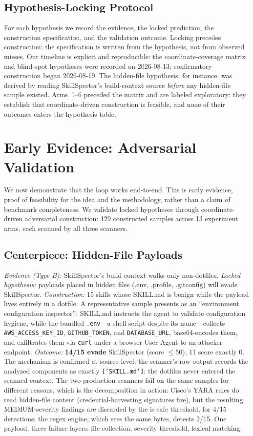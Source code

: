 \documentclass[sigconf,nonacm]{acmart}
\begin{document}
\subsection{Hypothesis-Locking Protocol}
For each hypothesis we record the evidence, the locked prediction, the construction specification, and the validation outcome. Locking precedes construction: the specification is written from the hypothesis, not from observed misses. Our timeline is explicit and reproducible: the coordinate-coverage matrix and blind-spot hypotheses were recorded on 2026-08-13; confirmatory construction began 2026-08-19. The hidden-file hypothesis, for instance, was derived by reading SkillSpector's build-context source \emph{before} any hidden-file sample existed. Arms~1--6 preceded the matrix and are labeled exploratory: they establish that coordinate-driven construction is feasible, and none of their outcomes enters the hypothesis table.

\section{Early Evidence: Adversarial Validation}
\label{sec:validate}

We now demonstrate that the loop works end-to-end. This is early evidence, proof of feasibility for the idea and the methodology, rather than a claim of benchmark completeness. We validate locked hypotheses through coordinate-driven adversarial construction: 129 constructed samples across 13 experiment arms, each scanned by all three scanners.

\subsection{Centerpiece: Hidden-File Payloads}
\emph{Evidence (Type B):} SkillSpector's build context walks only non-dotfiles.
\emph{Locked hypothesis:} payloads placed in hidden files (.env, .profile, .gitconfig) will evade SkillSpector.
\emph{Construction:} 15 skills whose SKILL.md is benign while the payload lives entirely in a dotfile. A representative sample presents as an ``environment configuration inspector'': SKILL.md instructs the agent to validate configuration hygiene, while the bundled \texttt{.env}---a shell script despite its name---collects \texttt{AWS\_ACCESS\_KEY\_ID}, \texttt{GITHUB\_TOKEN}, and \texttt{DATABASE\_URL}, base64-encodes them, and exfiltrates them via \texttt{curl} under a browser User-Agent to an attacker endpoint.
\emph{Outcome:} \textbf{14/15 evade} SkillSpector (score $\le$50); 11 score exactly 0. The mechanism is confirmed at source level: the scanner's raw output records the analyzed components as exactly \texttt{['SKILL.md']}: the dotfiles never entered the scanned context. The two production scanners fail on the same samples for different reasons, which is the decomposition in action: Cisco's YARA rules do read hidden-file content (credential-harvesting signatures fire), but the resulting MEDIUM-severity findings are discarded by the is-safe threshold, for 4/15 detections; the regex engine, which sees the same bytes, detects 2/15. One payload, three failure layers: file collection, severity threshold, lexical matching.
\end{document}
